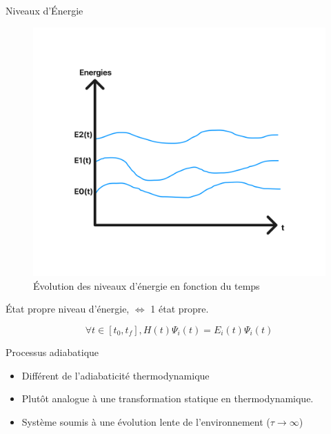 \documentclass{beamer}
\begin{document}


\begin{frame}{Niveaux d'Énergie}
\begin{figure}
    \centering
    \includegraphics[scale=0.2]{rsc/energies.png}
    \caption{Évolution des niveaux d'énergie en fonction du temps}
    \label{fig:energie}
\end{figure}

\end{frame}

\begin{frame}{État propre}
     niveau d'énergie, $\Leftrightarrow$ 1 état propre. 
\medskip

$$\forall t \in [t_0, t_f], H(t)\Psi_i(t) = E_i(t)\Psi_i(t)$$
\end{frame}

\begin{frame}{Processus adiabatique}

\begin{itemize}
    \item Différent de l'adiabaticité thermodynamique
    \item Plutôt analogue à une transformation statique en thermodynamique.
    \item Système soumis à une évolution lente de l'environnement ($\tau \xrightarrow{} \infty$)
\end{itemize}

\end{frame}
\end{document}
